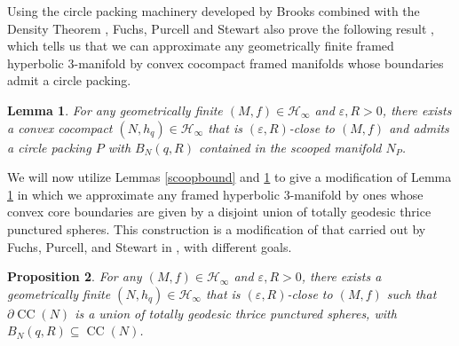\documentclass[11pt,leqno]{article}
\DeclareMathOperator{\CC}{CC}
\newtheorem{lemma}{Lemma}
\newtheorem{prop}[lemma]{Proposition}
\theoremstyle{introdef}
\numberwithin{lemma}{section}
\theoremstyle{definition}
\begin{document}
Using the circle packing machinery developed by Brooks \cite{BRO} combined with the Density Theorem \cite{NAM}, Fuchs, Purcell and Stewart also prove the following result \cite{PUR}, which tells us that we can approximate any geometrically finite framed hyperbolic $3$-manifold by convex cocompact framed manifolds whose boundaries admit a circle packing.

\begin{lemma}
\label{packapprox}
    For any geometrically finite $(M,f)\in\mathcal{H}_\infty$ and $\varepsilon,R>0$, there exists a convex cocompact $(N,h_q)\in\mathcal{H}_\infty$ that is $(\varepsilon, R)$-close to $(M,f)$ and admits a circle packing $P$ with $B_N(q,R)$ contained in the scooped manifold $N_P$.
\end{lemma}

We will now utilize Lemmas \ref{scoopbound} and \ref{packapprox} to give a modification of Lemma \ref{packapprox} in which we approximate any framed hyperbolic $3$-manifold by ones whose convex core boundaries are given by a disjoint union of totally geodesic thrice punctured spheres. This construction is a modification of that carried out by Fuchs, Purcell, and Stewart in \cite[Construction 3.10]{PUR}, with  different goals.

\begin{prop}
\label{approxwithsph}
    For any $(M,f)\in\mathcal{H}_\infty$ and $\varepsilon,R>0$, there exists a geometrically finite $(N,h_q)\in \mathcal{H}_\infty$ that is $(\varepsilon,R)$-close to $(M,f)$ such that $\partial\CC(N)$ is a union of totally geodesic thrice punctured spheres, with $B_N(q,R)\subseteq \CC(N)$.
\end{prop}
\end{document}
